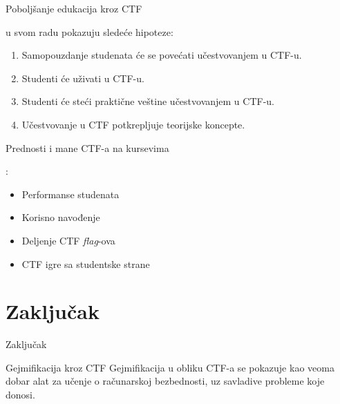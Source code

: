 \documentclass[aspectratio=169,xcolor=dvipsnames]{beamer}
\begin{document}

\begin{frame}{Poboljšanje edukacija kroz CTF}

    \cite{ctfleune} u svom radu pokazuju sledeće hipoteze:
    \begin{enumerate}
        \item Samopouzdanje studenata će se povećati učestvovanjem u CTF-u.
        \item Studenti će uživati u CTF-u.
        \item Studenti će steći praktične veštine učestvovanjem u CTF-u.
        \item Učestvovanje u CTF potkrepljuje teorijske koncepte.
    \end{enumerate}

\end{frame}


\begin{frame}{Prednosti i mane CTF-a na kursevima}

    \cite{ctfuni}:
    \begin{itemize}
        \item Performanse studenata
        \item Korisno navođenje
        \item Deljenje CTF \emph{flag}-ova
        \item CTF igre sa studentske strane
    \end{itemize}

\end{frame}

\section{Zaključak}

\begin{frame}{Zaključak}
    \begin{alertblock}{Gejmifikacija kroz CTF}
        Gejmifikacija u obliku CTF-a se pokazuje kao veoma dobar alat za 
        učenje o računarskoj bezbednosti, uz savladive probleme koje donosi.
    \end{alertblock}
\end{frame}
\end{document}
